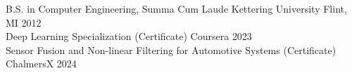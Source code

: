 \begin{samepage}
  \iflongform
    \nopagebreak
  \else
  \fi


  \begin{cventries}

    \cventryeducation
    {B.S. in Computer Engineering, Summa Cum Laude} %
    {Kettering University} %
    {Flint, MI} %
    {2012} %
    \iflongform
    \else
      \\\cventryeducation
      {Deep Learning Specialization (Certificate)} %
      {Coursera} %
      {} %
      {2023} %
      \\\cventryeducation
      {Sensor Fusion and Non-linear Filtering for Automotive Systems (Certificate)} %
      {ChalmersX} %
      {} %
      {2024} %
    \fi

  \end{cventries}
\end{samepage}